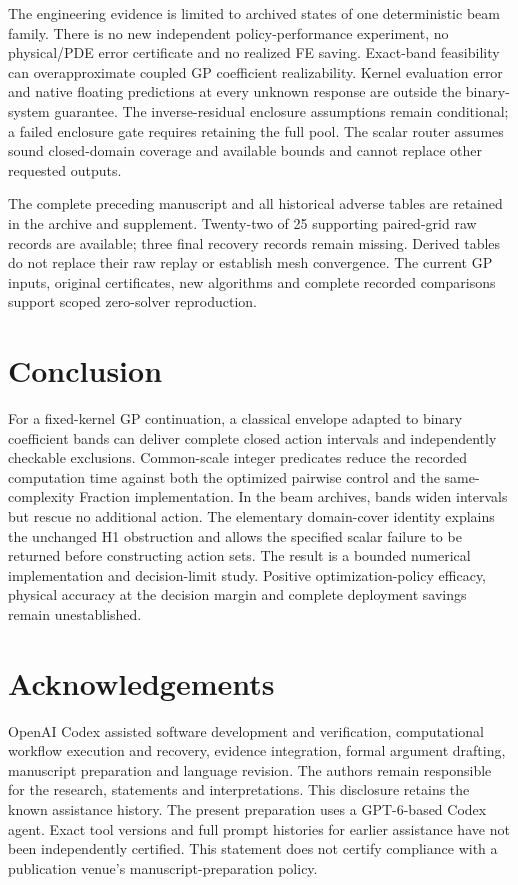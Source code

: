 \documentclass[]{interact}
\begin{document}
The engineering evidence is limited to archived states of one deterministic beam family. There is no new independent policy-performance experiment, no physical/PDE error certificate and no realized FE saving. Exact-band feasibility can overapproximate coupled GP coefficient realizability. Kernel evaluation error and native floating predictions at every unknown response are outside the binary-system guarantee. The inverse-residual enclosure assumptions remain conditional; a failed enclosure gate requires retaining the full pool. The scalar router assumes sound closed-domain coverage and available bounds and cannot replace other requested outputs.

The complete preceding manuscript and all historical adverse tables are retained in the archive and supplement. Twenty-two of 25 supporting paired-grid raw records are available; three final recovery records remain missing. Derived tables do not replace their raw replay or establish mesh convergence. The current GP inputs, original certificates, new algorithms and complete recorded comparisons support scoped zero-solver reproduction.

\section{Conclusion}

For a fixed-kernel GP continuation, a classical envelope adapted to binary coefficient bands can deliver complete closed action intervals and independently checkable exclusions. Common-scale integer predicates reduce the recorded computation time against both the optimized pairwise control and the same-complexity Fraction implementation. In the beam archives, bands widen intervals but rescue no additional action. The elementary domain-cover identity explains the unchanged H1 obstruction and allows the specified scalar failure to be returned before constructing action sets. The result is a bounded numerical implementation and decision-limit study. Positive optimization-policy efficacy, physical accuracy at the decision margin and complete deployment savings remain unestablished.

\section*{Acknowledgements}

OpenAI Codex assisted software development and verification, computational workflow execution and recovery, evidence integration, formal argument drafting, manuscript preparation and language revision. The authors remain responsible for the research, statements and interpretations. This disclosure retains the known assistance history. The present preparation uses a GPT-6-based Codex agent. Exact tool versions and full prompt histories for earlier assistance have not been independently certified. This statement does not certify compliance with a publication venue's manuscript-preparation policy.
\end{document}

